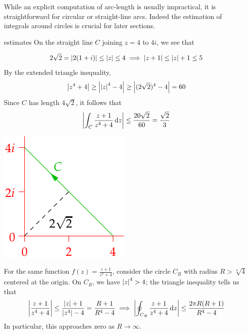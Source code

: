 While an explicit computation of arc-length is usually impractical, it is straightforward for circular or straight-line arcs. Indeed the estimation of integrals around circles is crucial for later sections.

\begin{examples}{}{estimates}
	\exstart On the straight line $C$ joining $z=4$ to $4i$, we see that\par
	\begin{enumerate}\setcounter{enumi}{1}
		\begin{minipage}[t]{0.65\linewidth}\vspace{-15pt}
		  \item[]
		  \[
		  	2\sqrt 2=\left| 2(1+i)\right|\le \left| z\right|\le 4 \implies \left| z+1\right|\le \left| z\right|+1\le 5
		  \]
		  By the extended triangle inequality,
		  \[
		  	\left| z^4+4\right|\ge \left| \left| z\right|^4-4\right|\ge \left| (2\sqrt 2)^4-4\right|= 60
		  \]
		  Since $C$ has length $4\sqrt 2$, it follows that
		  \[
		  	\left| \int_C\frac{z+1}{z^4+4}\,{\mathrm{d} z}\right| \le\frac{20\sqrt 2}{60}=\frac{\sqrt 2}{3}
		  \]
		\end{minipage}
		\hfill
		\begin{minipage}[t]{0.34\linewidth}\vspace{-15pt}
			\flushright\includegraphics{bound-ex1}
		\end{minipage}
	
	  \item For the same function $f(z)=\frac{z+1}{z^4+4}$, consider the circle $C_R$ with radius $R>\sqrt[4]{4}$ centered at the origin. On $C_R$, we have $\left| z\right|^4>4$; the triangle inequality tells us that
	  \[
	  	\left| \frac{z+1}{z^4+4}\right|\le\frac{\left| z\right|+1}{\left| z^4\right|-4} =\frac{R+1}{R^4-4}\implies \left| \oint_{C_R}\frac{z+1}{z^4+4}\,{\mathrm{d} z}\right|\le \frac{2\pi R(R+1)}{R^4-4}
	  \]
	  In particular, this approaches zero as $R\to\infty$.
	  

\end{enumerate}
\end{examples}
